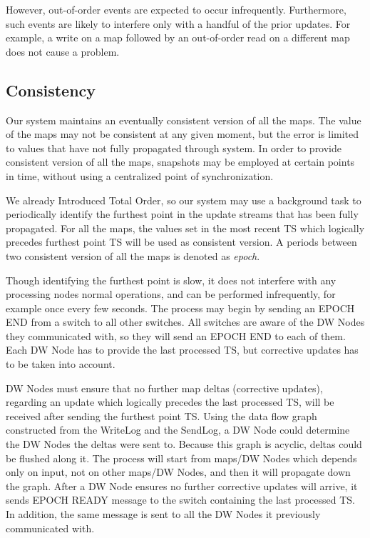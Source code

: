 \documentclass{sig-semester}
\begin{document}
However, out-of-order events are expected to occur infrequently. Furthermore, such events are likely to interfere only with a handful of the prior updates. For example, a write on a map followed by an out-of-order read on a different map does not cause a problem.

\subsection{Consistency}

Our system maintains an eventually consistent version of all the maps. The value of the maps may not be consistent at any given moment, but the error is limited to values that have not fully propagated through system. In order to provide consistent version of all the maps, snapshots may be employed at certain points in time, without using a centralized point of synchronization.

We already Introduced Total Order, so our system may use a background task to periodically identify the furthest point in the update streams that has been fully propagated. For all the maps, the values set in the most recent TS which logically precedes furthest point TS will be used as consistent version. A periods between two consistent version of all the maps is denoted as \textit{epoch}.

Though identifying the furthest point is slow, it does not interfere with any processing nodes normal operations, and can be performed infrequently, for example once every few seconds. The process may begin by sending an EPOCH END from a switch to all other switches. All switches are aware of the DW Nodes they communicated with, so they will send an EPOCH END to each of them. Each DW Node has to provide the last processed TS, but corrective updates has to be taken into account. 

DW Nodes must ensure that no further map deltas (corrective updates), regarding an update which logically precedes the last processed TS, will be received after sending the furthest point TS. Using the data flow graph constructed from the WriteLog and the SendLog, a DW Node could determine the DW Nodes the deltas were sent to. Because this graph is acyclic, deltas could be flushed along it. The process will start from maps/DW Nodes which depends only on input, not on other maps/DW Nodes, and then it will propagate down the graph. After a DW Node ensures no further corrective updates will arrive, it sends EPOCH READY message to the switch containing the last processed TS. In addition, the same message is sent to all the DW Nodes it previously communicated with.
\end{document}
